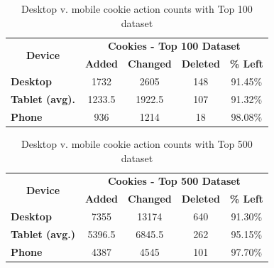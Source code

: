 \documentclass{acm_proc_article-sp}
\begin{document}
\begin{table}[htbp]
  \centering
  \caption{Desktop v. mobile cookie action counts with Top 100 dataset}
    \begin{tabular}{|c|c|c|c|c|}
    \hline
    \multicolumn{1}{|c|}{\multirow{2}[4]{*}{\textbf{Device}}} & \multicolumn{4}{|c|}{\textbf{Cookies - Top 100 Dataset}} \\ \cline{2-5}
    \multicolumn{1}{|c|}{} & \multicolumn{1}{|c|}{\textbf{Added}} & \multicolumn{1}{|c|}{\textbf{Changed}} & \multicolumn{1}{|c|}{\textbf{Deleted}} & \multicolumn{1}{|c|}{\textbf{\% Left}}\\ \hline
    \multicolumn{1}{|l|}{\textbf{Desktop}} & 1732   & 2605  & 148 & 91.45\% \\
    \multicolumn{1}{|l|}{\textbf{Tablet (avg).}} & 1233.5  & 1922.5  & 107 & 91.32\%\\
    \multicolumn{1}{|l|}{\textbf{Phone}} & 936   & 1214  & 18 & 98.08\% \\ \hline
    \end{tabular}%
  \label{tab:dm_cookie_counts_100}%
\end{table}%

\begin{table}[htbp]
  \centering
  \caption{Desktop v. mobile cookie action counts with Top 500 dataset}
    \begin{tabular}{|c|c|c|c|c|}
    \hline
    \multicolumn{1}{|c|}{\multirow{2}[4]{*}{\textbf{Device}}} & \multicolumn{4}{|c|}{\textbf{Cookies - Top 500 Dataset}} \\ \cline{2-5}
    \multicolumn{1}{|c|}{} & \multicolumn{1}{|c|}{\textbf{Added}} & \multicolumn{1}{|c|}{\textbf{Changed}} & \multicolumn{1}{|c|}{\textbf{Deleted}} & \multicolumn{1}{|c|}{\textbf{\% Left}}\\ \hline
\multicolumn{1}{|l|}{\textbf{Desktop}} & 7355  & 13174  & 640 & 91.30\%\\
    \multicolumn{1}{|l|}{\textbf{Tablet (avg.)}} & 5396.5  & 6845.5  & 262 & 95.15\%\\
    \multicolumn{1}{|l|}{\textbf{Phone}} & 4387  & 4545  & 101 & 97.70\%\\ \hline
    \end{tabular}%
  \label{tab:dm_cookie_counts_500}%
\end{table}%
\end{document}
